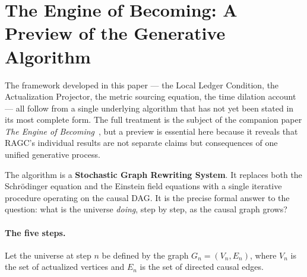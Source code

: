 \documentclass[11pt,a4paper]{article}
\theoremstyle{plain}
\theoremstyle{definition}
\theoremstyle{remark}
\begin{document}
\section{The Engine of Becoming: A Preview of the Generative Algorithm}
\label{sec:engine_preview}

The framework developed in this paper --- the Local Ledger Condition, the
Actualization Projector, the metric sourcing equation, the time dilation
account --- all follow from a single underlying algorithm that has not yet
been stated in its most complete form. The full treatment is the subject of
the companion paper \emph{The Engine of Becoming}~\citep{Sandeman2026RAEB}, but
a preview is essential here because it reveals that RAGC's individual results
are not separate claims but consequences of one unified generative process.

The algorithm is a \textbf{Stochastic Graph Rewriting System}. It replaces
both the Schr\"{o}dinger equation and the Einstein field equations with a
single iterative procedure operating on the causal DAG. It is the precise
formal answer to the question: what is the universe \emph{doing}, step by
step, as the causal graph grows?

\paragraph{The five steps.}
Let the universe at step $n$ be defined by the graph $G_n = (V_n, E_n)$,
where $V_n$ is the set of actualized vertices and $E_n$ is the set of directed
causal edges.
\end{document}
